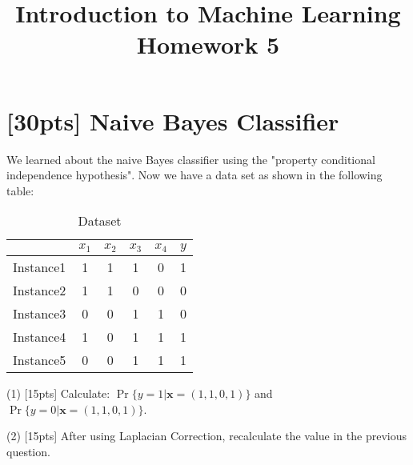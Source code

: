 \documentclass{article}
\title{Introduction to Machine Learning\\Homework 5}
\begin{document}
	\maketitle
	\section{[30pts] Naive Bayes Classifier}
	We learned about the naive Bayes classifier using the "property conditional independence hypothesis". Now we have a data set as shown in the following table:
	\begin{table}[htp]
		\centering
		\caption{Dataset}\label{tab:aStrangeTable}
		\begin{tabular}{c|ccccc}
			\hline 
				& $x_1$ & $x_2$ & $x_3$ & $x_4$ & $y$ \\ 
				\hline 
			Instance1	& 1 & 1 & 1 & 0 & 1 \\ 
				\hline 
			Instance2	& 1 & 1 & 0 & 0 & 0 \\ 
				\hline 
			Instance3	& 0 & 0 & 1 & 1 & 0 \\ 
				\hline 
			Instance4	& 1 & 0 & 1 & 1 & 1 \\ 
				\hline 
			Instance5	& 0 & 0 & 1 & 1 & 1 \\ 
				\hline 
		\end{tabular}
	\end{table} 
		

	\noindent
	(1) [15pts] Calculate: $\Pr\{ y=1 | \mathbf{x}=(1,1,0,1) \}$ and $\Pr\{ y=0 | \mathbf{x}=(1,1,0,1) \}$.
		
	\noindent
	(2) [15pts] After using Laplacian Correction, recalculate the value in the previous question.
	
\end{document}
